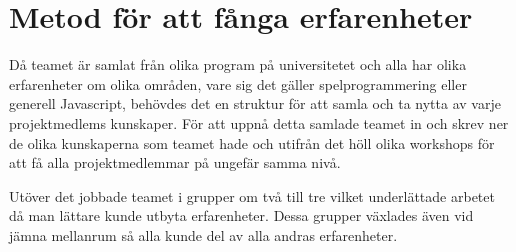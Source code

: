 \section{Metod för att fånga erfarenheter}
Då teamet är samlat från olika program på universitetet och alla har olika erfarenheter om olika områden, vare sig det gäller spelprogrammering eller generell Javascript, behövdes det en struktur för att samla och ta nytta av varje projektmedlems kunskaper. För att uppnå detta samlade teamet in och skrev ner de olika kunskaperna som teamet hade och utifrån det höll olika workshops för att få alla projektmedlemmar på ungefär samma nivå.

Utöver det jobbade teamet i grupper om två till tre vilket underlättade arbetet då man lättare kunde utbyta erfarenheter. Dessa grupper växlades även vid jämna mellanrum så alla kunde del av alla andras erfarenheter.



